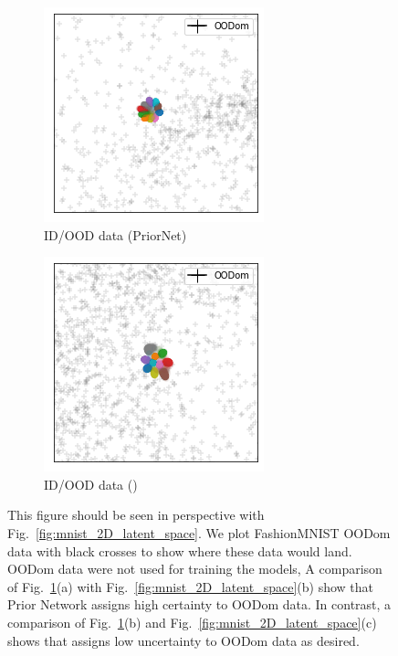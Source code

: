 
\begin{figure}[t!]
    \centering
    \begin{subfigure}[t]{0.46 \columnwidth}
        \centering
        \includegraphics[width=0.5 \textwidth]{sections/006_neurips2020/figures/2D_latent_klpn_3.png}
         \caption{ID/OOD data (PriorNet)}
    \end{subfigure}%
    \begin{subfigure}[t]{0.46 \columnwidth}
        \centering
        \includegraphics[width=0.5 \textwidth]{sections/006_neurips2020/figures/2D_latent_ours_bn_3.png}
         \caption{ID/OOD data (\PostNetacro)}
    \end{subfigure}%
    \caption{This figure should be seen in perspective with Fig.~\ref{fig:mnist_2D_latent_space}. We plot FashionMNIST OODom data with black crosses to show where these data would land. OODom data were not used for training the models, A comparison of Fig.~\ref{fig:mnist_2D_latent_space_2}(a) with Fig.~\ref{fig:mnist_2D_latent_space}(b) show that Prior Network assigns high certainty to OODom data. In contrast, a comparison of Fig.~\ref{fig:mnist_2D_latent_space_2}(b) and Fig.~\ref{fig:mnist_2D_latent_space}(c) shows that \PostNet assigns low uncertainty to OODom data as desired.}
    \label{fig:mnist_2D_latent_space_2}
\end{figure}

